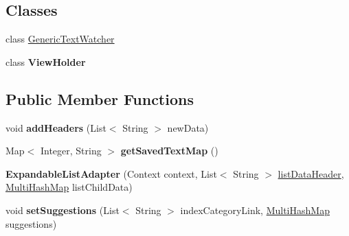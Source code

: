 \subsection*{Classes}
\begin{DoxyCompactItemize}
\item 
class \hyperlink{classcom_1_1example_1_1sebastian_1_1tindertp_1_1ExpandedListAdapters_1_1ExpandableListAdapter_1_1GenericTextWatcher}{Generic\+Text\+Watcher}
\item 
class {\bfseries View\+Holder}
\end{DoxyCompactItemize}
\subsection*{Public Member Functions}
\begin{DoxyCompactItemize}
\item 
void {\bfseries add\+Headers} (List$<$ String $>$ new\+Data)\hypertarget{classcom_1_1example_1_1sebastian_1_1tindertp_1_1ExpandedListAdapters_1_1ExpandableListAdapter_a33593891f7a084800b4711a6e421b411}{}\label{classcom_1_1example_1_1sebastian_1_1tindertp_1_1ExpandedListAdapters_1_1ExpandableListAdapter_a33593891f7a084800b4711a6e421b411}

\item 
Map$<$ Integer, String $>$ {\bfseries get\+Saved\+Text\+Map} ()\hypertarget{classcom_1_1example_1_1sebastian_1_1tindertp_1_1ExpandedListAdapters_1_1ExpandableListAdapter_ab2de729f29cfc8899c0deab441a0f3f5}{}\label{classcom_1_1example_1_1sebastian_1_1tindertp_1_1ExpandedListAdapters_1_1ExpandableListAdapter_ab2de729f29cfc8899c0deab441a0f3f5}

\item 
{\bfseries Expandable\+List\+Adapter} (Context context, List$<$ String $>$ \hyperlink{classcom_1_1example_1_1sebastian_1_1tindertp_1_1ExpandedListAdapters_1_1ExpandableListAdapter_aff8e58fc9ce6d2703713e165013a2382}{list\+Data\+Header}, \hyperlink{classcom_1_1example_1_1sebastian_1_1tindertp_1_1commonTools_1_1MultiHashMap}{Multi\+Hash\+Map} list\+Child\+Data)\hypertarget{classcom_1_1example_1_1sebastian_1_1tindertp_1_1ExpandedListAdapters_1_1ExpandableListAdapter_af7960105fc43a280a5672e5665d14b62}{}\label{classcom_1_1example_1_1sebastian_1_1tindertp_1_1ExpandedListAdapters_1_1ExpandableListAdapter_af7960105fc43a280a5672e5665d14b62}

\item 
void {\bfseries set\+Suggestions} (List$<$ String $>$ index\+Category\+Link, \hyperlink{classcom_1_1example_1_1sebastian_1_1tindertp_1_1commonTools_1_1MultiHashMap}{Multi\+Hash\+Map} suggestions)\hypertarget{classcom_1_1example_1_1sebastian_1_1tindertp_1_1ExpandedListAdapters_1_1ExpandableListAdapter_aa53ab6cbb67516d06f26918513c23c8b}{}\label{classcom_1_1example_1_1sebastian_1_1tindertp_1_1ExpandedListAdapters_1_1ExpandableListAdapter_aa53ab6cbb67516d06f26918513c23c8b}


\end{DoxyCompactItemize}
